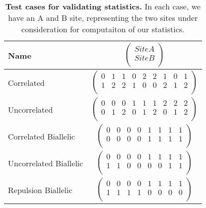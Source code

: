 \documentclass[12pt]{article}
\begin{document}
\begin{table}
  \begin{tabular}{lc} Name & $\left(\begin{array}{cc} Site A \\ Site B
                                     \\ \end{array}\right)$ \\

    \hline
    Correlated & $\left(\begin{array}{ccccccccc}
                          0 & 1 & 1 & 0 & 2 & 2 & 1 & 0 & 1 \\
                          1 & 2 & 2 & 1 & 0 & 0 & 2 & 1 & 2 \\
                        \end{array}\right)$ \\
    Uncorrelated & $\left(\begin{array}{ccccccccc}
                            0 & 0 & 0 & 1 & 1 & 1 & 2 & 2 & 2 \\
                            0 & 1 & 2 & 0 & 1 & 2 & 0 & 1 & 2 \\
                          \end{array}\right)$ \\
    Correlated Biallelic & $\left(\begin{array}{cccccccc}
                                    0 & 0 & 0 & 0 & 1 & 1 & 1 & 1 \\
                                    0 & 0 & 0 & 0 & 1 & 1 & 1 & 1 \\
                                  \end{array}\right)$ \\
    Uncorrelated Biallelic & $\left(\begin{array}{cccccccc}
                                      0 & 0 & 0 & 0 & 1 & 1 & 1 & 1 \\
                                      1 & 1 & 0 & 0 & 0 & 0 & 1 & 1 \\
                                    \end{array}\right)$ \\
    Repulsion Biallelic & $\left(\begin{array}{cccccccc}
                                   0 & 0 & 0 & 0 & 1 & 1 & 1 & 1 \\
                                   1 & 1 & 1 & 1 & 0 & 0 & 0 & 0 \\
                                 \end{array}\right)$ \\
  \end{tabular}
  \caption{
    \textbf{Test cases for validating statistics.}
    In each case, we have an A and B site, representing the two sites under
    consideration for computaiton of our statistics.
  }
  \label{table:test_cases}
\end{table}
\end{document}
